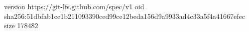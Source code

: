 version https://git-lfs.github.com/spec/v1
oid sha256:51dbfab1ce1b211093390ced99ce12beda156d9a9933ad4c33a5f4a41667efec
size 178482
